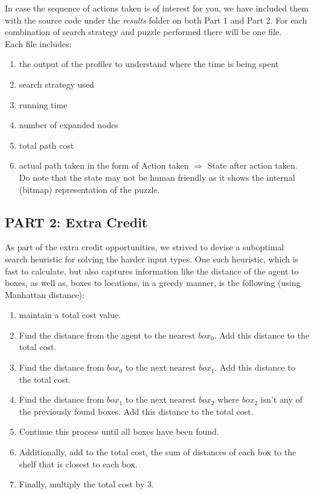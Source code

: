 \documentclass[11pt]{article}
\begin{document}
In case the sequence of actions taken is of interest for you, we have included them with the source code under the \textit{results} folder on both Part 1 and Part 2. For each combination of search strategy and puzzle performed there will be one file.\\
Each file includes:
\begin{enumerate}
\item the output of the profiler to understand where the time is being spent
\item search strategy used
\item running time
\item number of expanded nodes
\item total path cost
\item actual path taken in the form of Action taken $\Rightarrow$ State after action taken. Do note that the state may not be human friendly as it shows the internal (bitmap) representation of the puzzle.
\end{enumerate}

\subsection*{PART 2: Extra Credit}

As part of the extra credit opportunities, we strived to devise a suboptimal search heuristic for solving the harder input types. One such heuristic, which is fast to calculate, but also captures information like the distance of the agent to boxes, as well as, boxes to locations, in a greedy manner, is the following (using Manhattan distance):

\begin{enumerate}
\item maintain a total cost value.
\item Find the distance from the agent to the nearest $box_0$. Add this distance to the total cost.
\item Find the distance from $box_0$ to the next nearest $box_1$. Add this distance to the total cost.
\item Find the distance from $box_1$ to the next nearest $box_2$ where $box_2$ isn't any of the previously found boxes. Add this distance to the total cost.
\item Continue this process until all boxes have been found.
\item Additionally, add to the total cost, the sum of distances of each box to the shelf that is closest to each box.
\item Finally, multiply the total cost by 3.
\end{enumerate}
\end{document}
